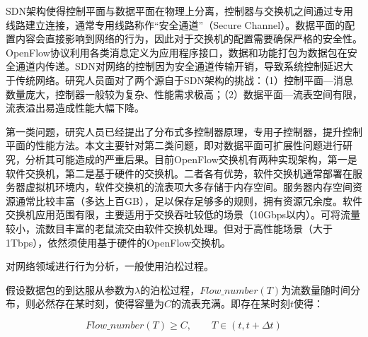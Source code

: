 
SDN架构使得控制平面与数据平面在物理上分离，控制器与交换机之间通过专用线路建立连接，通常专用线路称作“安全通道”（Secure Channel）。数据平面的配置内容会直接影响到网络的行为，因此对于交换机的配置需要确保严格的安全性。OpenFlow协议利用各类消息定义为应用程序接口，数据和功能打包为数据包在安全通道内传递。SDN对网络的控制因为安全通道传输开销，导致系统控制延迟大于传统网络。研究人员面对了两个源自于SDN架构的挑战：（1）控制平面---消息数量庞大，控制器一般较为复杂、性能需求极高；（2）数据平面---流表空间有限，流表溢出易造成性能大幅下降。

第一类问题，研究人员已经提出了分布式多控制器原理，专用子控制器，提升控制平面的性能方法。本文主要针对第二类问题，即对数据平面可扩展性问题进行研究，分析其可能造成的严重后果。目前OpenFlow交换机有两种实现架构，第一是软件交换机，第二是基于硬件的交换机。二者各有优势，软件交换机通常部署在服务器虚拟机环境内，软件交换机的流表项大多存储于内存空间。服务器内存空间资源通常比较丰富（多达上百GB），足以保存足够多的规则，拥有资源冗余度。软件交换机应用范围有限，主要适用于交换吞吐较低的场景（10Gbps以内）。可将流量较小，流数目丰富的老鼠流交由软件交换机处理。但对于高性能场景（大于1Tbps），依然须使用基于硬件的OpenFlow交换机。

对网络领域进行行为分析，一般使用泊松过程。

\begin{theorem}%
	假设数据包的到达服从参数为$\lambda$的泊松过程，$ Flow\_number(T) $为流数量随时间分布，则必然存在某时刻，使得容量为$C$的流表充满。即存在某时刻$t$使得：
	
	\begin{equation}
	Flow\_number(T) \geq C, \qquad T \in (t,t+\Delta t)
	\end{equation}
	
\end{theorem}


